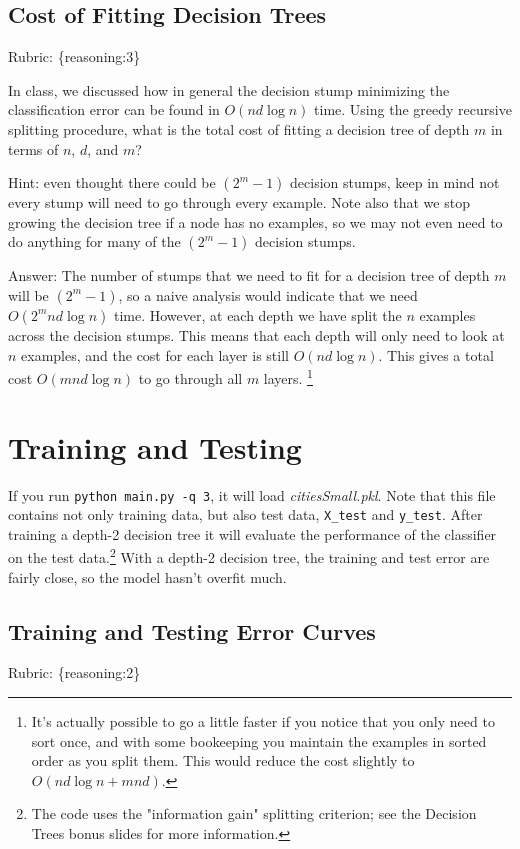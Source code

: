 \documentclass{article}
\def\ans#1{\par\gre{Answer: #1}}
\def\answer#1{\ans{#1}}
\def\rubric#1{\gre{Rubric: \{#1\}}}{}
\def\blu#1{{\color{blu}#1}}
\def\gre#1{{\color{gre}#1}}
\begin{document}
\subsection{Cost of Fitting Decision Trees}
\rubric{reasoning:3}

In class, we discussed how in general the decision stump minimizing the classification error can be found in $O(nd\log n)$ time.
Using the greedy recursive splitting procedure, \blu{what is the total cost of fitting a decision tree of depth $m$ in terms of $n$, $d$, and $m$?}

Hint: even thought there could be $(2^m-1)$ decision stumps, keep in mind not every stump will need to go through every example. Note also that we stop growing the decision tree if a node has no examples, so we may not even need to do anything for many of the $(2^m-1)$ decision stumps.

\answer{The number of stumps that we need to fit for a decision tree of depth $m$ will be $(2^m-1)$,
so a naive analysis would indicate that we need $O(2^mnd\log n)$ time.
However, at each depth we have split the $n$ examples across the decision stumps.
This means that each depth will only need to look at $n$ examples,
and the cost for each layer is still $O(nd\log n)$.
This gives a total cost $O(mnd\log n)$ to go through all $m$ layers.
\footnote{It's actually possible to go a little faster if you notice that you only need to sort once,
and with some bookeeping you maintain the examples in sorted order as you split them. This would reduce the cost slightly to $O(nd\log n + mnd)$.}}

\section{Training and Testing}
If you run \texttt{python main.py \string-q 3}, it will load \emph{citiesSmall.pkl}.
Note that this file contains not only training data, but also test data, \texttt{X\string_test} and \texttt{y\string_test}.
After training a depth-2 decision tree it will evaluate the performance of the classifier on the test data.\footnote{The code uses the "information gain" splitting criterion; see the Decision Trees bonus slides for more information.}
With a depth-2 decision tree, the training and test error are fairly close, so the model hasn't overfit much.

\subsection{Training and Testing Error Curves}
\rubric{reasoning:2}
\end{document}
